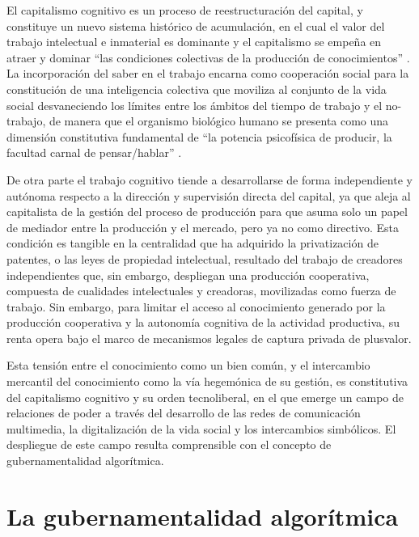 \documentclass[
  spanish,
  11pt,
  a4paper,
]{scrbook}
\begin{document}
El capitalismo cognitivo es un proceso de reestructuración del capital,
y constituye un nuevo sistema histórico de acumulación, en el cual el
valor del trabajo intelectual e inmaterial es dominante y el capitalismo
se empeña en atraer y dominar ``las condiciones colectivas de la
producción de conocimientos'' \autocite[29]{Vercellone2016}. La
incorporación del saber en el trabajo encarna como cooperación social
para la constitución de una inteligencia colectiva que moviliza al
conjunto de la vida social desvaneciendo los límites entre los ámbitos
del tiempo de trabajo y el no-trabajo, de manera que el organismo
biológico humano se presenta como una dimensión constitutiva fundamental
de ``la potencia psicofísica de producir, la facultad carnal de
pensar/hablar'' \autocite[19]{Virno2003}.

De otra parte el trabajo cognitivo tiende a desarrollarse de forma
independiente y autónoma respecto a la dirección y supervisión directa
del capital, ya que aleja al capitalista de la gestión del proceso de
producción para que asuma solo un papel de mediador entre la producción
y el mercado, pero ya no como directivo. Esta condición es tangible en
la centralidad que ha adquirido la privatización de patentes, o las
leyes de propiedad intelectual, resultado del trabajo de creadores
independientes que, sin embargo, despliegan una producción cooperativa,
compuesta de cualidades intelectuales y creadoras, movilizadas como
fuerza de trabajo. Sin embargo, para limitar el acceso al conocimiento
generado por la producción cooperativa y la autonomía cognitiva de la
actividad productiva, su renta opera bajo el marco de mecanismos legales
de captura privada de plusvalor.

Esta tensión entre el conocimiento como un bien común, y el intercambio
mercantil del conocimiento como la vía hegemónica de su gestión, es
constitutiva del capitalismo cognitivo y su orden tecnoliberal, en el
que emerge un campo de relaciones de poder a través del desarrollo de
las redes de comunicación multimedia, la digitalización de la vida
social y los intercambios simbólicos. El despliegue de este campo
resulta comprensible con el concepto de gubernamentalidad algorítmica.

\section*{La gubernamentalidad
algorítmica}\label{la-gubernamentalidad-algoruxedtmica}

\end{document}
